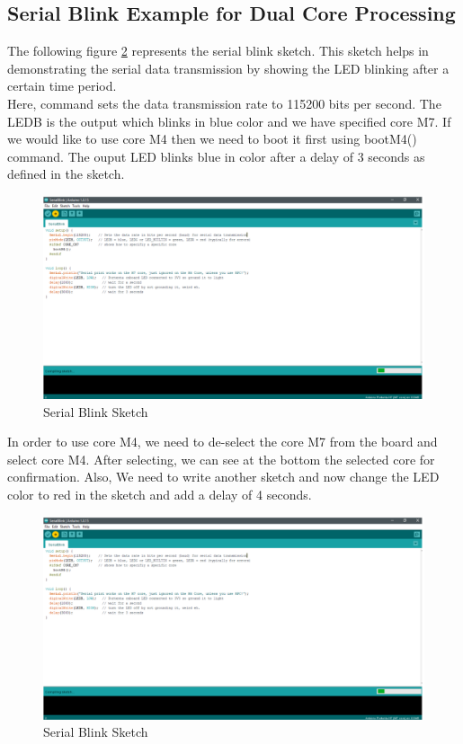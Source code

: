 \subsection{Serial Blink Example for Dual Core Processing}

The following figure \ref{SerialBlinkSketch} represents the serial blink sketch. This sketch helps in demonstrating the serial data transmission by showing the LED blinking after a certain time period. \\

Here,  command sets the data transmission rate to 115200 bits per second. The LEDB is the output which blinks in blue color and we have specified core M7. If we would like to use core M4 then we need to boot it first using bootM4() command. The ouput LED blinks blue in color after a delay of 3 seconds as defined in the sketch. \\

\begin{figure}
	\begin{center}
		\includegraphics[width=0.7\linewidth]{Images/ArduinoIDE/SerialBlink.png}
		\caption{Serial Blink Sketch}
		\label{SerialBlinkSketch1}
	\end{center}
\end{figure}

In order to use core M4, we need to de-select the core M7 from the board and select core M4. After selecting, we can see at the bottom the selected core for confirmation. Also, We need to write another sketch and now change the LED color to red in the sketch and add a delay of 4 seconds. \\
\begin{figure}
	\begin{center}
		\includegraphics[width=0.7\linewidth]{Images/ArduinoIDE/SerialBlink.png}
		\caption{Serial Blink Sketch}
		\label{SerialBlinkSketch}
	\end{center}
\end{figure}


